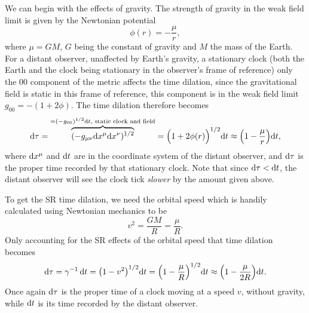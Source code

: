 \documentclass[11pt,a4paper, 
swedish, english %
]{article}
\begin{document}
We can begin with the effects of gravity. The strength of gravity in
the weak field limit is given by the Newtonian potential
\begin{equation}\label{eq3:phi}
\phi(r)=-\frac{\mu}{r},
\end{equation}
where $\mu=GM$, $G$ being the constant of gravity and $M$ the mass
of the Earth. For a distant observer, unaffected by Earth's gravity,
a stationary clock (both the Earth and the clock being stationary in
the observer's frame of reference) only the 00 component of the metric
affects the time dilation, since the gravitational field is static in
this frame of reference, this component is in the weak field limit
$g_{00}=-(1+2\phi)$. The time dilation therefore becomes 
\begin{equation}
\mathrm{d}\tau=
\overbrace{(-g_{\mu\nu}\mathrm{d}{x}^\mu\mathrm{d}{x}^\nu)^{1/2}}
^{=(-g_{00})^{1/2}\mathrm{d}{t},\text{ static clock and field}}
=\Big(1+2\phi(r)\Big)^{1/2}\mathrm{d}{t}
\approx\qty(1-\frac{\mu}{r})\mathrm{d}{t},
\end{equation}
where $\mathrm{d}{x}^\mu$ and $\mathrm{d}{t}$ are in the coordinate system of the distant
observer, and $\mathrm{d}\tau$ is the proper time recorded by that stationary
clock. Note that since $\mathrm{d}\tau<\mathrm{d}{t}$, the distant observer
will see the clock tick \emph{slower}\footnotemark{} by the amount
given above.  

\begin{figure}\centering
\caption{}
\label{fig:orbit}
\end{figure}

To get the SR time dilation, we need the orbital speed which is
handily calculated using Newtonian mechanics to be
\begin{equation}
v^2=\frac{GM}{R}=\frac{\mu}{R}.
\end{equation}
Only accounting for the SR effects of the orbital speed that time
dilation becomes
\begin{equation}
\mathrm{d}\tau=\gamma^{-1}\,\mathrm{d}{t}=\qty(1-v^2)^{1/2}\mathrm{d}{t}
=\qty(1-\frac{\mu}{R})^{1/2}\mathrm{d}{t}
\approx\qty(1-\frac{\mu}{2R})\mathrm{d}{t}.
\end{equation}
Once again $\mathrm{d}\tau$ is the proper time of a clock moving at a speed
$v$, without gravity, while $\mathrm{d}{t}$ is its time recorded by the
distant observer. 
\end{document}
